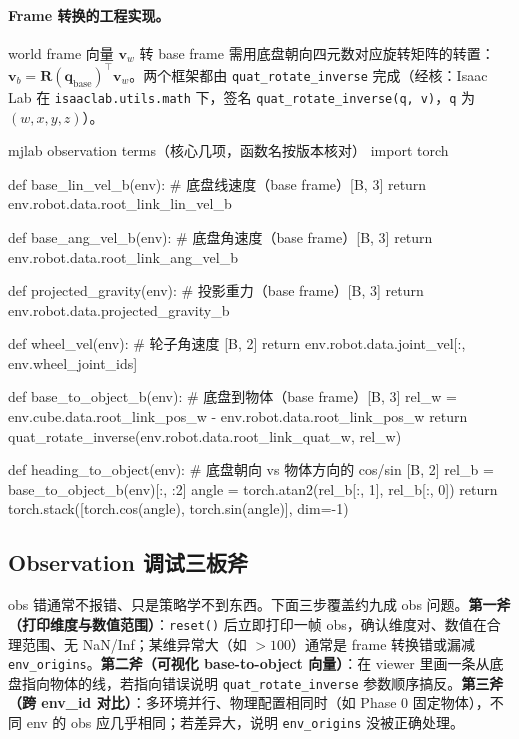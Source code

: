 \paragraph{Frame 转换的工程实现。}world frame 向量 $\mathbf{v}_w$ 转 base frame 需用底盘朝向四元数对应旋转矩阵的转置：$\mathbf{v}_b=\mathbf{R}(\mathbf{q}_{\text{base}})^{\!\top}\mathbf{v}_w$。两个框架都由 \verb|quat_rotate_inverse| 完成（经核：Isaac Lab 在 \verb|isaaclab.utils.math| 下，签名 \verb|quat_rotate_inverse(q, v)|，\verb|q| 为 $(w,x,y,z)$）。

\begin{codebox}[Python]{mjlab observation terms（核心几项，函数名按版本核对）}
import torch

def base_lin_vel_b(env):       # 底盘线速度（base frame）[B, 3]
    return env.robot.data.root_link_lin_vel_b

def base_ang_vel_b(env):       # 底盘角速度（base frame）[B, 3]
    return env.robot.data.root_link_ang_vel_b

def projected_gravity(env):    # 投影重力（base frame）[B, 3]
    return env.robot.data.projected_gravity_b

def wheel_vel(env):            # 轮子角速度 [B, 2]
    return env.robot.data.joint_vel[:, env.wheel_joint_ids]

def base_to_object_b(env):     # 底盘到物体（base frame）[B, 3]
    rel_w = env.cube.data.root_link_pos_w - env.robot.data.root_link_pos_w
    return quat_rotate_inverse(env.robot.data.root_link_quat_w, rel_w)

def heading_to_object(env):    # 底盘朝向 vs 物体方向的 cos/sin [B, 2]
    rel_b = base_to_object_b(env)[:, :2]
    angle = torch.atan2(rel_b[:, 1], rel_b[:, 0])
    return torch.stack([torch.cos(angle), torch.sin(angle)], dim=-1)
\end{codebox}

\subsection{Observation 调试三板斧}
\label{sec:rlmc-wh-obs-debug}

obs 错通常不报错、只是策略学不到东西。下面三步覆盖约九成 obs 问题。\textbf{第一斧（打印维度与数值范围）}：\verb|reset()| 后立即打印一帧 obs，确认维度对、数值在合理范围、无 NaN/Inf；某维异常大（如 $>100$）通常是 frame 转换错或漏减 \verb|env_origins|。\textbf{第二斧（可视化 base-to-object 向量）}：在 viewer 里画一条从底盘指向物体的线，若指向错误说明 \verb|quat_rotate_inverse| 参数顺序搞反。\textbf{第三斧（跨 env\_id 对比）}：多环境并行、物理配置相同时（如 Phase 0 固定物体），不同 env 的 obs 应几乎相同；若差异大，说明 \verb|env_origins| 没被正确处理。

